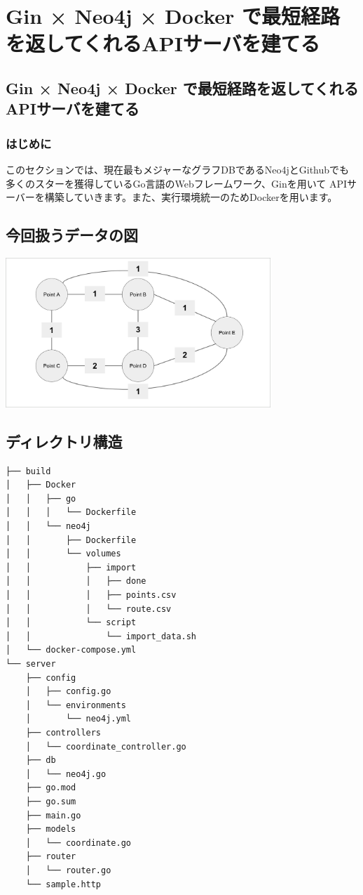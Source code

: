 
\chapter{Gin × Neo4j × Docker で最短経路を返してくれるAPIサーバを建てる}

\section{Gin × Neo4j × Docker で最短経路を返してくれるAPIサーバを建てる}
\subsection{はじめに}
このセクションでは、現在最もメジャーなグラフDBであるNeo4jとGithubでも多くのスターを獲得しているGo言語のWebフレームワーク、Ginを用いて
APIサーバーを構築していきます。また、実行環境統一のためDockerを用います。

\section{今回扱うデータの図}
\includegraphics[width=10cm]{./image/03-Tech/chap3/sample_node.png}

\section{ディレクトリ構造}
\begin{tcolorbox}[title=ディレクトリ構造]
    \begin{verbatim}
├── build
│   ├── Docker
│   │   ├── go
│   │   │   └── Dockerfile
│   │   └── neo4j
│   │       ├── Dockerfile
│   │       └── volumes
│   │           ├── import
│   │           │   ├── done
│   │           │   ├── points.csv
│   │           │   └── route.csv
│   │           └── script
│   │               └── import_data.sh
│   └── docker-compose.yml
└── server
    ├── config
    │   ├── config.go
    │   └── environments
    │       └── neo4j.yml
    ├── controllers
    │   └── coordinate_controller.go
    ├── db
    │   └── neo4j.go
    ├── go.mod
    ├── go.sum
    ├── main.go
    ├── models
    │   └── coordinate.go
    ├── router
    │   └── router.go
    └── sample.http
\end{verbatim}
\end{tcolorbox}

